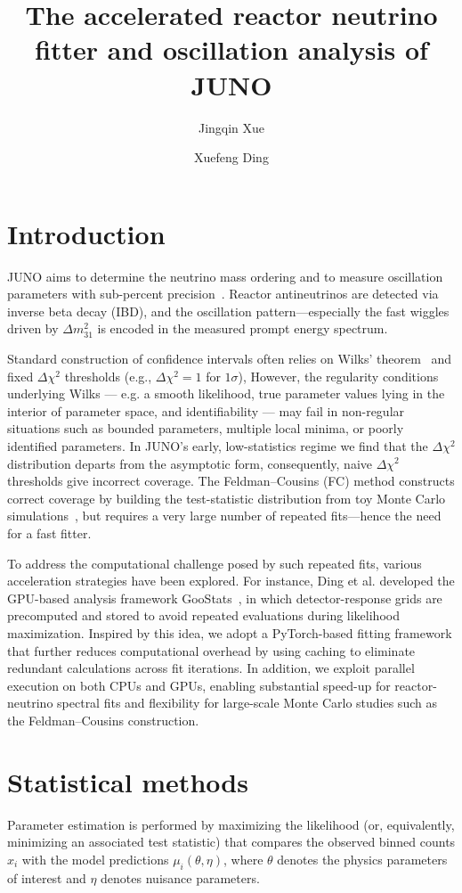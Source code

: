 \documentclass[a4paper,11pt]{article}
\title{The accelerated reactor neutrino fitter and oscillation analysis of JUNO}
\author*[a,b]{Jingqin Xue}
\author[a,b]{Xuefeng Ding}
\affiliation[a]{Institute of High Energy Physics, Chinese Academy of Sciences, Beijing, China}
\affiliation[b]{University of Chinese Academy of Sciences, Beijing 100049, China}
\begin{document}
\maketitle


\section{Introduction}
JUNO aims to determine the neutrino mass ordering and to measure oscillation parameters with sub-percent precision~\cite{Abusleme2025}. Reactor antineutrinos are detected via inverse beta decay (IBD), and the oscillation pattern—especially the fast wiggles driven by $\Delta m_{31}^2$ is encoded in the measured prompt energy spectrum.

Standard construction of confidence intervals often relies on Wilks' theorem~\cite{Wilks1938} and fixed $\Delta\chi^2$ thresholds (e.g., $\Delta\chi^2 = 1$ for $1\sigma$), However, the regularity conditions underlying Wilks — e.g. a smooth likelihood, true parameter values lying in the interior of parameter space, and identifiability — may fail in non-regular situations such as bounded parameters, multiple local minima, or poorly identified parameters. In JUNO's early, low-statistics regime we find that the $\Delta\chi^2$ distribution departs from the asymptotic form, consequently, naive $\Delta\chi^2$ thresholds give incorrect coverage. The Feldman--Cousins (FC) method constructs correct coverage by building the test-statistic distribution from toy Monte Carlo simulations~\cite{Feldman_1998}, but requires a very large number of repeated fits---hence the need for a fast fitter.

To address the computational challenge posed by such repeated fits, various acceleration strategies have been explored. For instance, Ding et al. developed the GPU-based analysis framework GooStats~\cite{Ding_2018}, in which detector-response grids are precomputed and stored to avoid repeated evaluations during likelihood maximization. Inspired by this idea, we adopt a PyTorch-based fitting framework that further reduces computational overhead by using caching to eliminate redundant calculations across fit iterations. In addition, we exploit parallel execution on both CPUs and GPUs, enabling substantial speed-up for reactor-neutrino spectral fits and flexibility for large-scale Monte Carlo studies such as the Feldman–Cousins construction.

\section{Statistical methods}
Parameter estimation is performed by maximizing the likelihood (or, equivalently, minimizing an associated test statistic) that compares the observed binned counts $x_i$ with the model predictions $\mu_i(\theta,\eta)$, where $\theta$ denotes the physics parameters of interest and $\eta$ denotes nuisance parameters.
\end{document}
